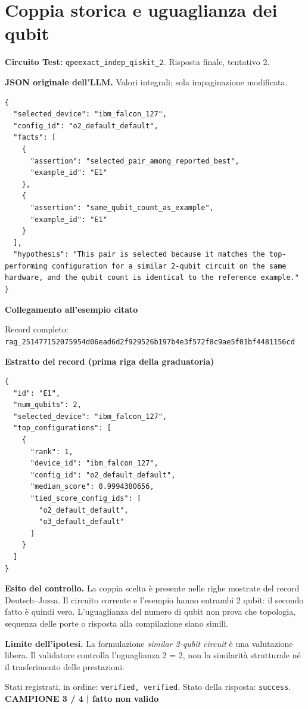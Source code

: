 \documentclass[a4paper,10pt]{article}
\newcommand{\tagline}[1]{{\small\color{ink}\textbf{#1}}\par}
\begin{document}
\section*{Coppia storica e uguaglianza dei qubit}
\textbf{Circuito Test:} \texttt{qpeexact\_indep\_qiskit\_2}. Risposta finale, tentativo 2.\par
\textbf{JSON originale dell'LLM.} Valori integrali; sola impaginazione modificata.\par
\begin{lstlisting}
{
  "selected_device": "ibm_falcon_127",
  "config_id": "o2_default_default",
  "facts": [
    {
      "assertion": "selected_pair_among_reported_best",
      "example_id": "E1"
    },
    {
      "assertion": "same_qubit_count_as_example",
      "example_id": "E1"
    }
  ],
  "hypothesis": "This pair is selected because it matches the top-performing configuration for a similar 2-qubit circuit on the same hardware, and the qubit count is identical to the reference example."
}
\end{lstlisting}

\textbf{Collegamento all'esempio citato}
\begin{center}\end{center}
{\footnotesize Record completo: \texttt{rag\_251477152075954d06ead6d2f929526b197b4e3f572f8c9ae5f01bf4481156cd}}\par
\textbf{Estratto del record (prima riga della graduatoria)}
\begin{lstlisting}
{
  "id": "E1",
  "num_qubits": 2,
  "selected_device": "ibm_falcon_127",
  "top_configurations": [
    {
      "rank": 1,
      "device_id": "ibm_falcon_127",
      "config_id": "o2_default_default",
      "median_score": 0.9994380656,
      "tied_score_config_ids": [
        "o2_default_default",
        "o3_default_default"
      ]
    }
  ]
}
\end{lstlisting}

\textbf{Esito del controllo.} La coppia scelta è presente nelle righe mostrate del record Deutsch--Jozsa. Il circuito corrente e l'esempio hanno entrambi 2 qubit: il secondo fatto è quindi vero. L'uguaglianza del numero di qubit non prova che topologia, sequenza delle porte o risposta alla compilazione siano simili.\par
{\color{warn}\textbf{Limite dell'ipotesi.}} La formulazione \emph{similar 2-qubit circuit} è una valutazione libera. Il validatore controlla l'uguaglianza 2 = 2, non la similarità strutturale né il trasferimento delle prestazioni.\par
{\small Stati registrati, in ordine: \texttt{verified, verified}. Stato della risposta: \texttt{success}.}
\newpage
\tagline{CAMPIONE 3 / 4 | fatto non valido}
\end{document}
